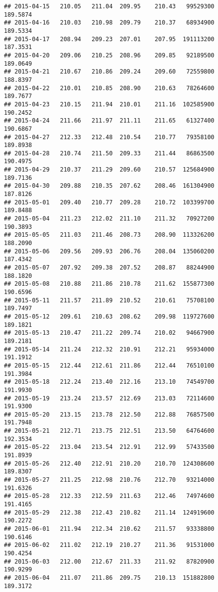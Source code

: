 \documentclass[
]{article}
\begin{document}
\begin{verbatim}
## 2015-04-15   210.05   211.04  209.95    210.43   99529300     189.5874
## 2015-04-16   210.03   210.98  209.79    210.37   68934900     189.5334
## 2015-04-17   208.94   209.23  207.01    207.95  191113200     187.3531
## 2015-04-20   209.06   210.25  208.96    209.85   92189500     189.0649
## 2015-04-21   210.67   210.86  209.24    209.60   72559800     188.8397
## 2015-04-22   210.01   210.85  208.90    210.63   78264600     189.7677
## 2015-04-23   210.15   211.94  210.01    211.16  102585900     190.2452
## 2015-04-24   211.66   211.97  211.11    211.65   61327400     190.6867
## 2015-04-27   212.33   212.48  210.54    210.77   79358100     189.8938
## 2015-04-28   210.74   211.50  209.33    211.44   86863500     190.4975
## 2015-04-29   210.37   211.29  209.60    210.57  125684900     189.7136
## 2015-04-30   209.88   210.35  207.62    208.46  161304900     187.8126
## 2015-05-01   209.40   210.77  209.28    210.72  103399700     189.8488
## 2015-05-04   211.23   212.02  211.10    211.32   70927200     190.3893
## 2015-05-05   211.03   211.46  208.73    208.90  113326200     188.2090
## 2015-05-06   209.56   209.93  206.76    208.04  135060200     187.4342
## 2015-05-07   207.92   209.38  207.52    208.87   88244900     188.1820
## 2015-05-08   210.88   211.86  210.78    211.62  155877300     190.6596
## 2015-05-11   211.57   211.89  210.52    210.61   75708100     189.7497
## 2015-05-12   209.61   210.63  208.62    209.98  119727600     189.1821
## 2015-05-13   210.47   211.22  209.74    210.02   94667900     189.2181
## 2015-05-14   211.24   212.32  210.91    212.21   95934000     191.1912
## 2015-05-15   212.44   212.61  211.86    212.44   76510100     191.3984
## 2015-05-18   212.24   213.40  212.16    213.10   74549700     191.9930
## 2015-05-19   213.24   213.57  212.69    213.03   72114600     191.9300
## 2015-05-20   213.15   213.78  212.50    212.88   76857500     191.7948
## 2015-05-21   212.71   213.75  212.51    213.50   64764600     192.3534
## 2015-05-22   213.04   213.54  212.91    212.99   57433500     191.8939
## 2015-05-26   212.40   212.91  210.20    210.70  124308600     189.8307
## 2015-05-27   211.25   212.98  210.76    212.70   93214000     191.6326
## 2015-05-28   212.33   212.59  211.63    212.46   74974600     191.4165
## 2015-05-29   212.38   212.43  210.82    211.14  124919600     190.2272
## 2015-06-01   211.94   212.34  210.62    211.57   93338800     190.6146
## 2015-06-02   211.02   212.19  210.27    211.36   91531000     190.4254
## 2015-06-03   212.00   212.67  211.33    211.92   87820900     190.9299
## 2015-06-04   211.07   211.86  209.75    210.13  151882800     189.3172

\end{verbatim}
\end{document}
